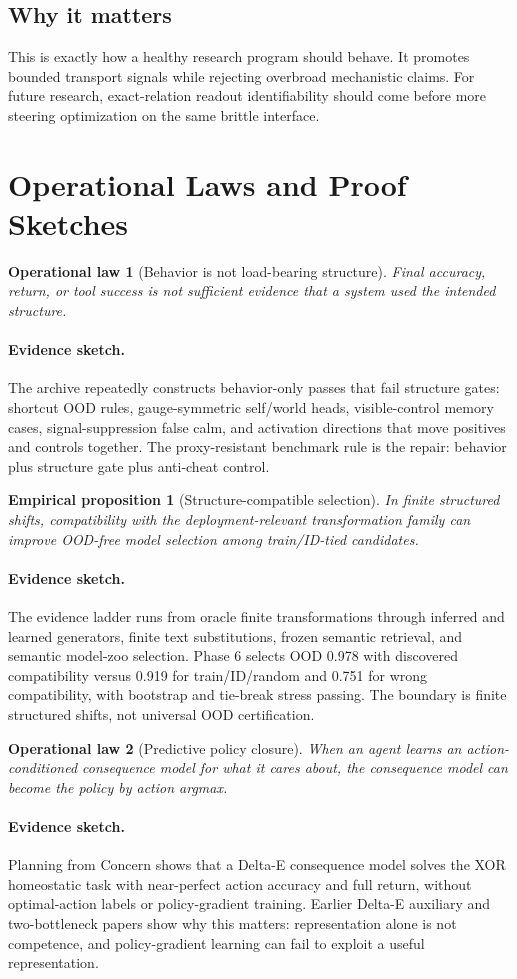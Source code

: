 \documentclass[11pt]{article}
\newtheorem{law}{Operational law}
\newtheorem{proposition}{Empirical proposition}
\newenvironment{proofsketch}{\paragraph{Evidence sketch.}}{}
\begin{document}
\subsection{Why it matters}

This is exactly how a healthy research program should behave. It promotes
bounded transport signals while rejecting overbroad mechanistic claims. For
future research, exact-relation readout identifiability should come before more
steering optimization on the same brittle interface.

\section{Operational Laws and Proof Sketches}

\begin{law}[Behavior is not load-bearing structure]
Final accuracy, return, or tool success is not sufficient evidence that a
system used the intended structure.
\end{law}
\begin{proofsketch}
The archive repeatedly constructs behavior-only passes that fail structure
gates: shortcut OOD rules, gauge-symmetric self/world heads, visible-control
memory cases, signal-suppression false calm, and activation directions that
move positives and controls together. The proxy-resistant benchmark rule is the
repair: behavior plus structure gate plus anti-cheat control.
\end{proofsketch}

\begin{proposition}[Structure-compatible selection]
In finite structured shifts, compatibility with the deployment-relevant
transformation family can improve OOD-free model selection among train/ID-tied
candidates.
\end{proposition}
\begin{proofsketch}
The evidence ladder runs from oracle finite transformations through inferred
and learned generators, finite text substitutions, frozen semantic retrieval,
and semantic model-zoo selection. Phase 6 selects OOD 0.978 with discovered
compatibility versus 0.919 for train/ID/random and 0.751 for wrong
compatibility, with bootstrap and tie-break stress passing. The boundary is
finite structured shifts, not universal OOD certification.
\end{proofsketch}

\begin{law}[Predictive policy closure]
When an agent learns an action-conditioned consequence model for what it cares
about, the consequence model can become the policy by action argmax.
\end{law}
\begin{proofsketch}
Planning from Concern shows that a Delta-E consequence model solves the XOR
homeostatic task with near-perfect action accuracy and full return, without
optimal-action labels or policy-gradient training. Earlier Delta-E auxiliary
and two-bottleneck papers show why this matters: representation alone is not
competence, and policy-gradient learning can fail to exploit a useful
representation.
\end{proofsketch}
\end{document}
